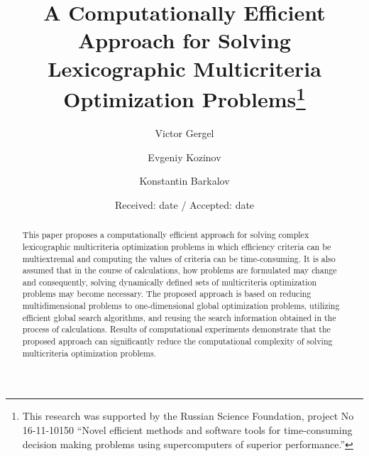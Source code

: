 \documentclass[smallextended]{svjour3}       %
\begin{document}
\title{A Computationally Efficient Approach for Solving Lexicographic Multicriteria Optimization Problems\thanks{This research was supported by the Russian Science Foundation, project No 16-11-10150 ``Novel efficient methods and software tools for time-consuming decision making problems using supercomputers of superior performance.''}
}


\author{Victor Gergel %
\and
Evgeniy Kozinov
\and
Konstantin Barkalov
}



\date{Received: date / Accepted: date}

\maketitle

\begin{abstract}
This paper proposes a computationally efficient approach for solving complex lexicographic multicriteria optimization problems in which efficiency criteria can be multiextremal and computing the values of criteria can be time-consuming. It is also assumed that in the course of calculations, how problems are formulated may change and consequently, solving dynamically defined sets of multicriteria optimization problems may become necessary. The proposed approach is based on reducing multidimensional problems to one-dimensional global optimization problems, utilizing efficient global search algorithms, and reusing the search information obtained in the process of calculations. Results of computational experiments demonstrate that the proposed approach can significantly reduce the computational complexity of solving multicriteria optimization problems.
\end{abstract}
\end{document}
